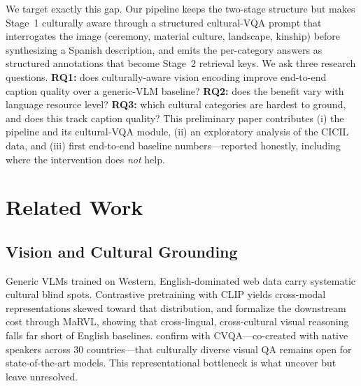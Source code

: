 \documentclass[11pt]{article}
\begin{document}
We target exactly this gap. Our pipeline keeps the two-stage structure but makes
Stage~1 culturally aware through a structured cultural-VQA prompt that
interrogates the image (ceremony, material culture, landscape, kinship) before
synthesizing a Spanish description, and emits the per-category answers as
structured annotations that become Stage~2 retrieval keys. We ask three
research questions. \textbf{RQ1:} does culturally-aware vision encoding improve
end-to-end caption quality over a generic-VLM baseline? \textbf{RQ2:} does the
benefit vary with language resource level? \textbf{RQ3:} which cultural
categories are hardest to ground, and does this track caption quality? This
preliminary paper contributes (i) the pipeline and its cultural-VQA module,
(ii) an exploratory analysis of the CICIL data, and (iii) first end-to-end
baseline numbers—reported honestly, including where the intervention does
\emph{not} help.

\section{Related Work}

\subsection{Vision and Cultural Grounding}
Generic VLMs trained on Western, English-dominated web data carry systematic
cultural blind spots. Contrastive pretraining with CLIP \citep{radford2021clip}
yields cross-modal representations skewed toward that distribution, and
\citet{liu2021marvl} formalize the downstream cost through MaRVL, showing that
cross-lingual, cross-cultural visual reasoning falls far short of English
baselines. \citet{romero2024cvqa} confirm with CVQA—co-created with native
speakers across 30 countries—that culturally diverse visual QA remains open for
state-of-the-art models. This representational bottleneck is what
\citet{dhawan2026gators} uncover but leave unresolved.
\end{document}
